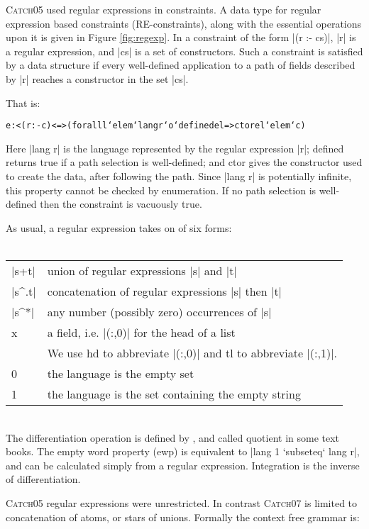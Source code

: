 \documentclass[preprint]{sigplanconf}
\newcommand{\C}[1]{\textsf{#1}}
\newcommand{\catch}{\textsc{Catch}}
\newenvironment{code}{\begin{alltt}\small}{\end{alltt}}
\begin{document}
\catch05 used regular expressions in constraints. A data type for regular expression based constraints (RE-constraints), along with the essential operations upon it is given in Figure \ref{fig:regexp}. In a constraint of the form |(r :- cs)|, |r| is a regular expression, and |cs| is a set of constructors. Such a constraint is satisfied by a data structure if every well-defined application to a path of fields described by |r| reaches a constructor in the set |cs|.

That is:

\begin{code}
e :< (r :- c) <=> (forall l `elem` lang r `o` defined e l => ctor e l `elem` c)
\end{code}

Here |lang r| is the language represented by the regular expression |r|; \C{defined} returns true if a path selection is well-defined; and \C{ctor} gives the constructor used to create the data, after following the path. Since |lang r| is potentially infinite, this property cannot be checked by enumeration. If no path selection is well-defined then the constraint is vacuously true.

As usual, a regular expression takes on of six forms:\\ \\
\begin{tabular}{ll}
|s+t|  & union of regular expressions |s| and |t| \\
|s^.t| & concatenation of regular expressions |s| then |t| \\
|s^*|  & any number (possibly zero) occurrences of |s| \\
\C{x}  & a field, i.e. |(:,0)| for the head of a list \\
       & We use \C{hd} to abbreviate |(:,0)| and \C{tl} to abbreviate |(:,1)|. \\
0      & the language is the empty set \\
1      & the language is the set containing the empty string
\end{tabular} \\

The differentiation operation is defined by \citet{conway:regexp}, and called quotient in some text books. The empty word property (\C{ewp}) is equivalent to |lang 1 `subseteq` lang r|, and can be calculated simply from a regular expression. Integration is the inverse of differentiation.

\catch05 regular expressions were unrestricted. In contrast \catch07 is limited to concatenation of atoms, or stars of unions. Formally the context free grammar is:
\end{document}
